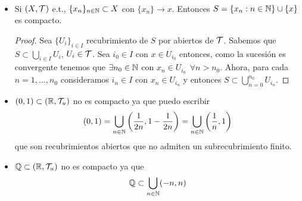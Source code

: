 \begin{ejemplo}\
    \begin{itemize}
        \item Si $(X, \mathcal{T})$ e.t., $\{x_n\}_{n\in \mathbb{N}}\subset X$ con $\{x_n\}\to x$. Entonces $S=\{x_n:n\in \mathbb{N}\}\cup\{x\}$ es compacto.
        \begin{proof}
            Sea $\{U_i\}_{i\in I}$ recubrimiento de $S$ por abiertos de $\mathcal{T}$. Sabemos que $S\subset \bigcup_{i\in I}U_i$, $U_i\in \mathcal{T}$. Sea $i_0\in I$ con $x\in U_{i_0}$ entonces, como la sucesión es convergente tenemos que $\exists n_0\in \mathbb{N}$ con $x_n\in U_{i_0}\ \ \forall n>n_0$. Ahora, para cada $n=1,\dots,n_0$ consideramos $i_n\in I$ con $x_n\in U_{i_n}$ y entonces $S\subset \bigcup_{n=0}^{n_0}U_{i_n}$.

        \end{proof}
        \item $(0,1)\subset (\mathbb{R}, \mathcal{T}_u)$ no es compacto ya que puedo escribir
        \begin{align*}
            (0,1)=\bigcup\limits_{n\in \mathbb{N}}\left(\frac{1}{2n}, 1 - \frac{1}{2n}\right) = \bigcup\limits_{n\in \mathbb{N}} \left(\frac{1}{n}, 1\right)
        \end{align*}
        que son recubrimientos abiertos que no admiten un subrecubrimiento finito.
        \item $\mathbb{Q}\subset (\mathbb{R}, \mathcal{T}_u)$ no es compacto ya que 
        \begin{align*}
            \mathbb{Q}\subset \bigcup\limits_{n\in \mathbb{N}}(-n,n)
        \end{align*}
    \end{itemize}
\end{ejemplo}

